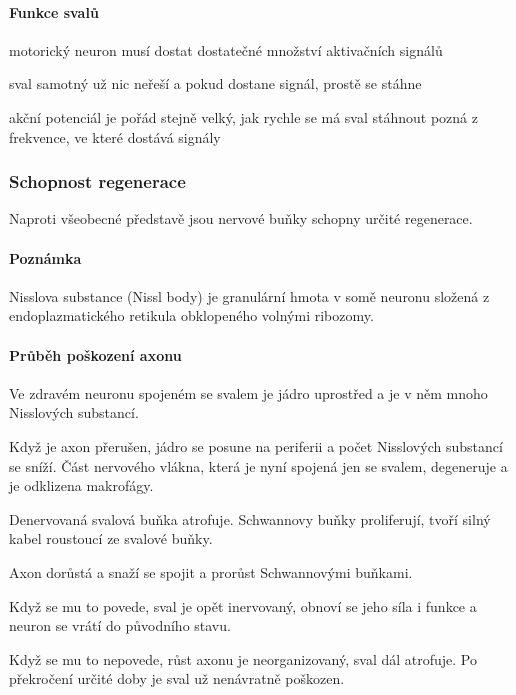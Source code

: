 \documentclass[DIV=8]{scrreprt}
\newcommand{\mybox}[2]{
    \paragraph{#1} #2
}
\begin{document}
\paragraph{Funkce svalů}
\begin{myItemize}[nosep]
    \item motorický neuron musí dostat dostatečné množství aktivačních signálů
    \item sval samotný už nic neřeší a pokud dostane signál, prostě se stáhne
    \item akční potenciál je pořád stejně velký, jak rychle se má sval stáhnout pozná z frekvence, ve které dostává signály
\end{myItemize}



\subsubsection{Schopnost regenerace} \label{Schopnost regenerace}



Naproti všeobecné představě jsou nervové buňky schopny určité regenerace.

\mybox{Poznámka}{Nisslova substance (Nissl body) je granulární hmota v somě neuronu složená z endoplazmatického retikula obklopeného volnými ribozomy.}


\paragraph{Průběh poškození axonu}
\begin{myEnumerate}[nosep]
    \item Ve zdravém neuronu spojeném se svalem je jádro uprostřed a je v něm mnoho Nisslových substancí.
    \item Když je axon přerušen, jádro se posune na periferii a počet Nisslových substancí se sníží. Část nervového vlákna, která je nyní spojená jen se svalem, degeneruje a je odklizena makrofágy.
    \item Denervovaná svalová buňka atrofuje. Schwannovy buňky proliferují, tvoří silný kabel roustoucí ze svalové buňky.
    \item Axon dorůstá a snaží se spojit a prorůst Schwannovými buňkami.
\begin{myItemize}[nosep]
    \item Když se mu to povede, sval je opět inervovaný, obnoví se jeho síla i funkce a neuron se vrátí do původního stavu.
    \item Když se mu to nepovede, růst axonu je neorganizovaný, sval dál atrofuje. Po překročení určité doby je sval už nenávratně poškozen.
\end{myItemize}

\end{myEnumerate}
\end{document}
